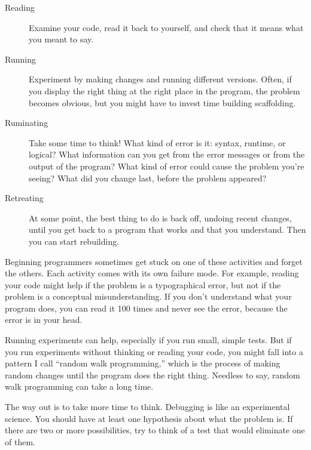 \documentclass[../../book.tex]{subfiles}
\begin{document}
\begin{description}

\item[Reading] Examine your code, read it back to yourself, and
check that it means what you meant to say.

\item[Running] Experiment by making changes and running different
versions.  Often, if you display the right thing at the right place
in the program, the problem becomes obvious, but you might have to invest time building scaffolding.

\item[Ruminating] Take some time to think!  What kind of error
is it: syntax, runtime, or logical?  What information can you get from
the error messages or from the output of the program?  What kind of
error could cause the problem you're seeing?  What did you change
last, before the problem appeared?

\item[Retreating] At some point, the best thing to do is back
off, undoing recent changes, until you get back to a program that
works and that you understand.  Then you can start rebuilding.

\end{description}

Beginning programmers sometimes get stuck on one of these activities
and forget the others.  Each activity comes with its own failure
mode.
For example, reading your code might help if the problem is a
typographical error, but not if the problem is a conceptual
misunderstanding.  If you don't understand what your program does, you
can read it 100 times and never see the error, because the error is in
your head.

Running experiments can help, especially if you run small, simple
tests.  But if you run experiments without thinking or reading your
code, you might fall into a pattern I call ``random walk programming,''
which is the process of making random changes until the program
does the right thing.  Needless to say, random walk programming
can take a long time.


The way out is to take more time to think.  Debugging is like an
experimental science.  You should have at least one hypothesis about
what the problem is.  If there are two or more possibilities, try to
think of a test that would eliminate one of them.

\end{document}

